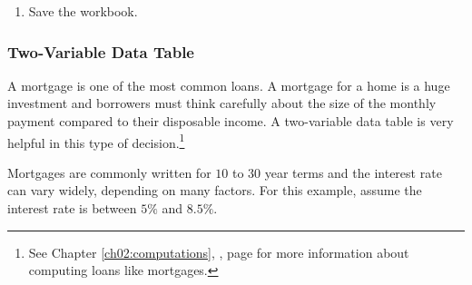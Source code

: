 \begin{enumerate}[resume]
	\item Save the  workbook.
\end{enumerate}

\subsubsection{Two-Variable Data Table}

A mortgage is one of the most common loans. A mortgage for a home is a huge investment and borrowers must think carefully about the size of the monthly payment compared to their disposable income. A two-variable data table is very helpful in this type of decision.\footnote{See Chapter \ref{ch02:computations}, , page \pageref{ch02:computations} for more information about computing loans like mortgages.}

Mortgages are commonly written for $ 10 $ to $ 30 $ year terms and the interest rate can vary widely, depending on many factors. For this example, assume the interest rate is between $ 5\% $ and $ 8.5\% $.

